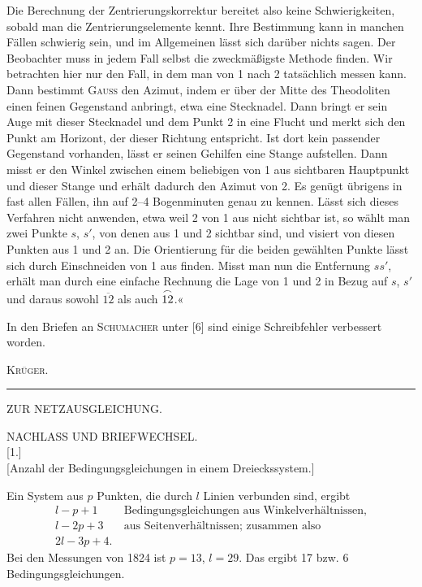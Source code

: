 Die Berechnung der Zentrierungskorrektur bereitet also keine Schwierigkeiten, sobald man die Zentrierungselemente kennt. Ihre Bestimmung kann in manchen Fällen schwierig sein, und im Allgemeinen lässt sich darüber nichts sagen. Der Beobachter muss in jedem Fall selbst die zweckmäßigste Methode finden. Wir betrachten hier nur den Fall, in dem man von 1 nach 2 tatsächlich messen kann. Dann bestimmt \textsc{Gauss} den Azimut, indem er über der Mitte des Theodoliten einen feinen Gegenstand anbringt, etwa eine Stecknadel. Dann bringt er sein Auge mit dieser Stecknadel und dem Punkt 2 in eine Flucht und merkt sich den Punkt am Horizont, der dieser Richtung entspricht. Ist dort kein passender Gegenstand vorhanden, lässt er seinen Gehilfen eine Stange aufstellen. Dann misst er den Winkel zwischen einem beliebigen von 1 aus sichtbaren Hauptpunkt und dieser Stange und erhält dadurch den Azimut von 2. Es genügt übrigens in fast allen Fällen, ihn auf 2--4 Bogenminuten genau zu kennen. Lässt sich dieses Verfahren nicht anwenden, etwa weil 2 von 1 aus nicht sichtbar ist, so wählt man zwei Punkte $s$, $s'$, von denen aus 1 und 2 sichtbar sind, und visiert von diesen Punkten aus 1 und 2 an. Die Orientierung für die beiden gewählten Punkte lässt sich durch Einschneiden von 1 aus finden. Misst man nun die Entfernung $ss'$, erhält man durch eine einfache Rechnung die Lage von 1 und 2 in Bezug auf $s$, $s'$ und daraus sowohl $\overline{12}$ als auch $\overset{\frown}{12}$.«

\medskip
In den Briefen an \textsc{Schumacher} unter [6] sind einige Schreibfehler verbessert worden.

\hfill\textsc{Krüger.}
\vfill
\begin{center}\rule{4cm}{.4pt}\end{center}

\clearpage\null
\clearpage
\vspace*{\fill}
\begin{center}{\LARGE ZUR NETZAUSGLEICHUNG.}\end{center}
\vfill
\clearpage\null
\clearpage
\begin{center}
{\Large NACHLASS UND BRIEFWECHSEL.}\\[2cm]
[1.]\\[3pt]
[Anzahl der Bedingungsgleichungen in einem Dreieckssystem.]
\end{center}
Ein System aus $p$ Punkten, die durch $l$ Linien verbunden sind, ergibt
\[
\begin{aligned}
l-p+1\quad&\text{Bedingungsgleichungen aus Winkelverhältnissen,}\\
l-2p+3\quad&\text{aus Seitenverhältnissen; zusammen also}\\
2l-3p+4.&
\end{aligned}
\]
\noindent{}\indent Bei den Messungen von 1824 ist $p=13$, $l=29$. Das ergibt 17 bzw. 6 Bedingungsgleichungen.

